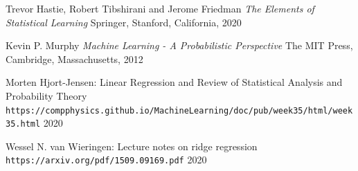 \documentclass{article}
\begin{document}
\begin{thebibliography}{3}
Trevor Hastie, Robert Tibshirani and Jerome Friedman
\textit{The Elements of Statistical Learning}
Springer, Stanford, California, 2020

Kevin P. Murphy
\textit{Machine Learning - A Probabilistic Perspective}
The MIT Press, Cambridge, Massachusetts, 2012

Morten Hjort-Jensen: Linear Regression and Review of Statistical Analysis and Probability Theory 
\\\texttt{https://compphysics.github.io/MachineLearning/doc/pub/week35/html/week35.html}
2020

Wessel N. van Wieringen: Lecture notes on ridge regression
\\\texttt{https://arxiv.org/pdf/1509.09169.pdf}
2020

\end{thebibliography}
\end{document}
